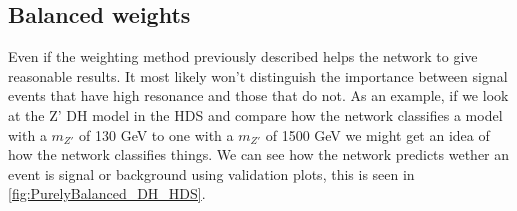 \documentclass[14pt, a4paper]{book}
\begin{document}
\clearpage



\subsection{Balanced weights}\label{sec:Balanced_wgts}
Even if the weighting method previously described helps the network to give reasonable results. It most likely won't distinguish the importance between signal events that have high resonance and those that do not. 
As an example, if we look at the Z' DH model in the HDS and compare how the network classifies a model with a $m_{Z'}$ of 130 GeV to one with a $m_{Z'}$ of 1500 GeV we might get an idea of how the network classifies things.
We can see how the network predicts wether an event is signal or background using validation plots, this is seen in \ref{fig:PurelyBalanced_DH_HDS}.
\graphicspath{{../../../Plots/TESTING/NeuralNetwork/BALANCED_WEIGHTING/ONLY_BALANCE_MC_EVENTS_BKG_DOWN/}}
\end{document}
